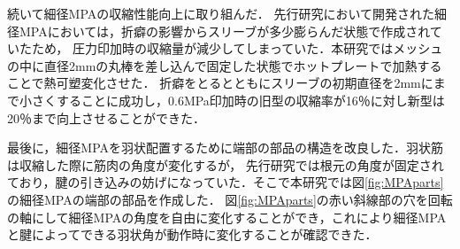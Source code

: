 \documentclass{jarticle}
\begin{document}
続いて細径MPAの収縮性能向上に取り組んだ．
先行研究\cite{crabrobot1}において開発された細径MPAにおいては，折癖の影響からスリーブが多少膨らんだ状態で作成されていたため，
圧力印加時の収縮量が減少してしまっていた．本研究ではメッシュの中に直径2mmの丸棒を差し込んで固定した状態でホットプレートで加熱することで熱可塑変化させた．
折癖をとるとともにスリーブの初期直径を2mmにまで小さくすることに成功し，0.6MPa印加時の旧型の収縮率が16％に対し新型は20％まで向上させることができた．

最後に，細径MPAを羽状配置するために端部の部品の構造を改良した．羽状筋は収縮した際に筋肉の角度が変化するが，
先行研究\cite{crabrobot1}では根元の角度が固定されており，腱の引き込みの妨げになっていた．そこで本研究では図\ref{fig:MPAparts}の細径MPAの端部の部品を作成した．
図\ref{fig:MPAparts}の赤い斜線部の穴を回転の軸にして細径MPAの角度を自由に変化することができ，これにより細径MPAと腱によってできる羽状角が動作時に変化することが確認できた．
\end{document}
